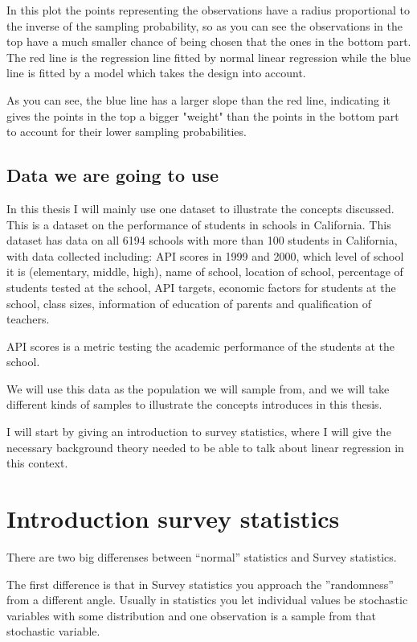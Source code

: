 \documentclass{article}
\begin{document}
\begin{example}
In this plot the points representing the observations have a radius proportional to the inverse of the sampling probability, so as you can see the observations in the top have a much smaller chance of being chosen that the ones in the bottom part. The red line is the regression line fitted by normal linear regression while the blue line is fitted by a model which takes the design into account. 

As you can see, the blue line has a larger slope than the red line, indicating it gives the points in the top a bigger "weight" than the points in the bottom part to account for their lower sampling probabilities.

\end{example}

\subsection{Data we are going to use}

In this thesis I will mainly use one dataset to illustrate the concepts
discussed. This is a dataset on the performance of students in schools in
California. This dataset has data on all 6194 schools with more than 100
students in California, with data collected
including: API scores in 1999 and 2000, which level of school it is
(elementary, middle, high), name of school, location of school, percentage of
students tested at the school, API targets, economic factors for students at the
school, class sizes, information of education of parents and qualification of teachers.

API scores is a metric testing the academic performance of the students at the school.

We will use this data as the population we will sample from, and we will take
different kinds of samples to illustrate the concepts introduces in this thesis.

I will start by giving an introduction to survey statistics, where I will give the necessary background theory needed to be able to talk about linear regression in this context.

\section{Introduction survey statistics}

There are two big differenses between ``normal'' statistics and Survey statistics.

The first difference is that in Survey statistics you approach the ''randomness'' from a different angle.
Usually in statistics you let individual values be stochastic variables
with some distribution and one observation is a sample from that stochastic
variable.
\end{document}
